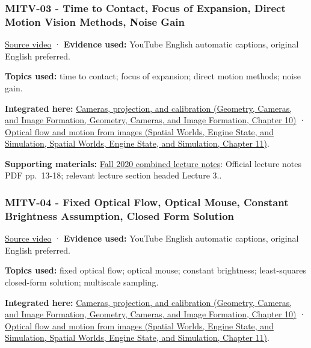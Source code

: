 \subsubsection{MITV-03 - Time to Contact, Focus of Expansion, Direct Motion Vision Methods, Noise Gain}\label{04-visual-computing-ii-ch036-mitv-03---time-to-contact-focus-of-expansion-direct-motion-vision-methods-noise-gain}

\href{https://www.youtube.com/watch?v=t9w_WuyVJ-A}{Source video} · \textbf{Evidence used:} YouTube English automatic captions, original English preferred.

\textbf{Topics used:} time to contact; focus of expansion; direct motion methods; noise gain.

\textbf{Integrated here:} \href{../03-Geometry-Cameras-and-Image-Formation/main.pdf\#nameddest=03-visual-computing-i-ch003-cameras-projection-and-calibration}{Cameras, projection, and calibration (Geometry, Cameras, and Image Formation, Geometry, Cameras, and Image Formation, Chapter 10)} · \href{../05-Spatial-Worlds-Engine-State-and-Simulation/main.pdf\#nameddest=04-visual-computing-ii-ch030-optical-flow-and-motion-from-images}{Optical flow and motion from images (Spatial Worlds, Engine State, and Simulation, Spatial Worlds, Engine State, and Simulation, Chapter 11)}.

\textbf{Supporting materials:} \href{https://ocw.mit.edu/courses/6-801-machine-vision-fall-2020/9ec44f69e72995c370b3797818ba01e6_MIT6_801F20_lectureNotes.pdf}{Fall 2020 combined lecture notes}: Official lecture notes PDF pp.~13-18; relevant lecture section headed Lecture 3..

\subsubsection{MITV-04 - Fixed Optical Flow, Optical Mouse, Constant Brightness Assumption, Closed Form Solution}\label{04-visual-computing-ii-ch036-mitv-04---fixed-optical-flow-optical-mouse-constant-brightness-assumption-closed-form-solution}

\href{https://www.youtube.com/watch?v=3NarS3QpaU0}{Source video} · \textbf{Evidence used:} YouTube English automatic captions, original English preferred.

\textbf{Topics used:} fixed optical flow; optical mouse; constant brightness; least-squares closed-form solution; multiscale sampling.

\textbf{Integrated here:} \href{../03-Geometry-Cameras-and-Image-Formation/main.pdf\#nameddest=03-visual-computing-i-ch003-cameras-projection-and-calibration}{Cameras, projection, and calibration (Geometry, Cameras, and Image Formation, Geometry, Cameras, and Image Formation, Chapter 10)} · \href{../05-Spatial-Worlds-Engine-State-and-Simulation/main.pdf\#nameddest=04-visual-computing-ii-ch030-optical-flow-and-motion-from-images}{Optical flow and motion from images (Spatial Worlds, Engine State, and Simulation, Spatial Worlds, Engine State, and Simulation, Chapter 11)}.

